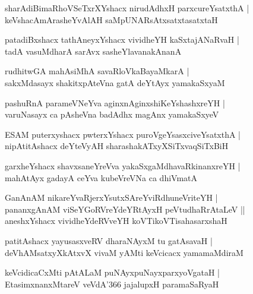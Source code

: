 \documentclass[twoside,12pt,openright]{book}
\newcounter{shloka}[chapter]
\begin{document}
\begin{shloka}%
sharAdiBimaRhoVSeTxrXYshacx nirudAdhxH parxcureYsatxthA |\\
keVshacAmArasheYvAlAH saMpUNARsAtxsatxtasatxtaH 
\end{shloka}

\begin{shloka}%
patadiBxshacx tathAneyxYshacx vividheYH kaSxtajANaRvaH |\\
tadA vasuMdharA sarAvx sasheYlavanakAnanA
\end{shloka}

\begin{shloka}%
rudhitwGA mahAsiMhA savaRloVkaBayaMkarA |\\
sakxMdasayx shakitxpAteVna gatA deYtAyx yamakaSxyaM
\end{shloka}

\begin{shloka}%
pashuRnA parameVNeYva aginxnAginxshiKeYshashxreYH |\\
varuNasayx ca pAsheVna badAdhx magAnx yamakaSxyeV 
\end{shloka}

\begin{shloka}%
ESAM puterxyshacx pwterxYshacx puroVgeYsasxciveYsatxthA |\\
nipAtitAshacx deYteVyAH sharashakATxyXSiTxvaqSiTxBiH 
\end{shloka}

\begin{shloka}%
garxheYshacx shavxsaneYreVva yakaSxgaMdhavaRkinanxreYH |\\
mahAtAyx gadayA ceYva kubeVreVNa ca dhiVmatA 
\end{shloka}

\begin{shloka}%
GanAnAM nikareYvaRjerxYsutxSAreYviRdhuneVriteYH |\\
pananxgAnAM viSeYGoRVreYdeYRtAyxH peVtudhaRrAtaLeV ||\\
aneshxYshacx vividheYdeRVveYH koVTikoVTisahasarxshaH 
\end{shloka}

\begin{shloka}%
patitAshacx yayusasxveRV dharaNAyxM tu gatAsavaH |\\
deVhAMsatxyXkAtxvX vivaM yAMti keVcicacx yamamaMdiraM 
\end{shloka}

\begin{shloka}%
keVcidicaCxMti pAtALaM puNAyxpuNayxparxyoVgataH |\\
EtasimxnanxMtareV veVdA\char'366 jajalupxH paramaSaRyaH 
\end{shloka}
\end{document}
